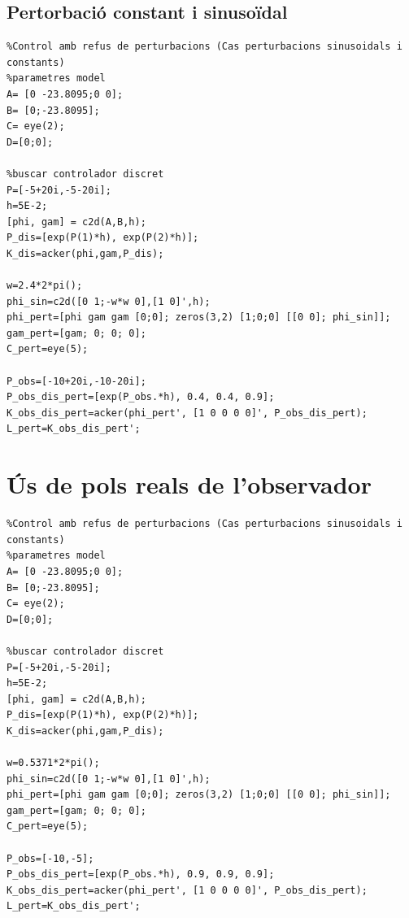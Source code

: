 \documentclass[12pt,a4paper,final,twoside,openright]{report}
\begin{document}
\subsection{Pertorbació constant i sinusoïdal}\label{ann:mat_pert_ct_sin}
\begin{verbatim}
%Control amb refus de perturbacions (Cas perturbacions sinusoidals i constants)
%parametres model
A= [0 -23.8095;0 0];
B= [0;-23.8095];
C= eye(2);
D=[0;0];

%buscar controlador discret
P=[-5+20i,-5-20i];
h=5E-2;
[phi, gam] = c2d(A,B,h);
P_dis=[exp(P(1)*h), exp(P(2)*h)];
K_dis=acker(phi,gam,P_dis);

w=2.4*2*pi();
phi_sin=c2d([0 1;-w*w 0],[1 0]',h);
phi_pert=[phi gam gam [0;0]; zeros(3,2) [1;0;0] [[0 0]; phi_sin]];
gam_pert=[gam; 0; 0; 0];
C_pert=eye(5);

P_obs=[-10+20i,-10-20i];
P_obs_dis_pert=[exp(P_obs.*h), 0.4, 0.4, 0.9];
K_obs_dis_pert=acker(phi_pert', [1 0 0 0 0]', P_obs_dis_pert);
L_pert=K_obs_dis_pert';
\end{verbatim}

\section{Ús de pols reals de l'observador}
\begin{verbatim}
%Control amb refus de perturbacions (Cas perturbacions sinusoidals i constants)
%parametres model
A= [0 -23.8095;0 0];
B= [0;-23.8095];
C= eye(2);
D=[0;0];

%buscar controlador discret
P=[-5+20i,-5-20i];
h=5E-2;
[phi, gam] = c2d(A,B,h);
P_dis=[exp(P(1)*h), exp(P(2)*h)];
K_dis=acker(phi,gam,P_dis);

w=0.5371*2*pi();
phi_sin=c2d([0 1;-w*w 0],[1 0]',h);
phi_pert=[phi gam gam [0;0]; zeros(3,2) [1;0;0] [[0 0]; phi_sin]];
gam_pert=[gam; 0; 0; 0];
C_pert=eye(5);

P_obs=[-10,-5];
P_obs_dis_pert=[exp(P_obs.*h), 0.9, 0.9, 0.9];
K_obs_dis_pert=acker(phi_pert', [1 0 0 0 0]', P_obs_dis_pert);
L_pert=K_obs_dis_pert';
\end{verbatim}
\end{document}
